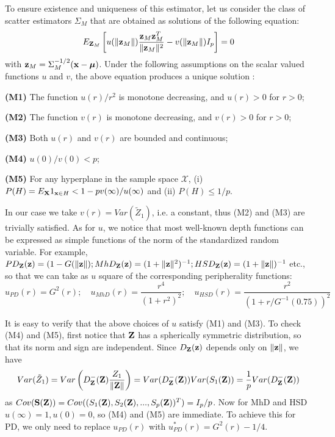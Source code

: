 To ensure existence and uniqueness of this estimator, let us consider the class of scatter estimators $\Sigma_M$ that are obtained as solutions of the following equation:
%
\begin{equation}
E_{{\mathbf{Z}}_M} \left[ u( \| {\bf{z}}_M \| )  \frac{{\bf{z}}_M {\bf{z}}_M^T}{\| {\bf{z}}_M \|^2}  - v( \| {\bf{z}}_M \| ) I_p \right] = 0
\end{equation}
%
with ${\bf{z}}_M = \Sigma_M^{-1/2} ({\bf{x}} - {\boldsymbol{\mu}})$. Under the following assumptions on the scalar valued functions $u$ and $v$, the above equation produces a unique solution \citep{HuberBook81}:
%

\vspace{1em}
\noindent\textbf{(M1)} The function $u(r)/r^2$ is monotone decreasing, and $u(r)>0$ for $r>0$;

\noindent\textbf{(M2)}  The function $v(r)$ is monotone decreasing, and $v(r)>0$ for $r>0$;

\noindent\textbf{(M3)} Both $u(r)$ and $v(r)$ are bounded and continuous;

\noindent\textbf{(M4)} $u(0) / v(0) < p$;

\noindent\textbf{(M5)} For any hyperplane in the sample space $\mathcal X$, (i) $P(H) = E_{\mathbf{X}} 1_{{\bf{x}} \in H} < 1 - p v(\infty) / u(\infty)$ and (ii) $P(H) \leq 1/p$.
%

\vspace{1em}
\noindent In our case we take $v(r) = Var(\tilde Z_1)$, i.e. a constant, thus (M2) and (M3) are trivially satisfied. As for $u$, we notice that most well-known depth functions can be expressed as simple functions of the norm of the standardized random variable. For example, $PD_{\mathbf{Z}} ({\bf{z}}) = (1 - G(\| {\bf{z}} \|); MhD_{\mathbf{Z}} ({\bf{z}}) = (1+\| {\bf{z}} \|^2)^{-1}; HSD_{\mathbf{Z}} ({\bf{z}}) = (1+\| {\bf{z}} \|)^{-1}$ etc., so that we can take as $u$ square of the corresponding peripherality functions:
$$
u_{PD} (r) = G^2 (r); \quad u_{MhD}(r)  = \frac{r^4}{(1 + r^2)^2}; \quad u_{HSD}(r)  = \frac{r^2}{(1 + r/G^{-1}(0.75))^2}
$$
%

It is easy to verify that the above choices of $u$ satisfy (M1) and (M3). To check (M4) and (M5), first notice that ${\mathbf{Z}}$ has a spherically symmetric distribution, so that its norm and sign are independent. Since $D_{\mathbf{Z}}({\bf{z}})$ depends only on $\| {\bf{z}} \|$, we have
%
$$
Var (\tilde Z_1) = Var \left( D^-_{\mathbf{Z}} ({\mathbf{Z}}) \frac{Z_1}{ \|{\mathbf{Z}} \|} \right) = Var (D^-_{\mathbf{Z}} ({\mathbf{Z}})) Var (S_1 ({\mathbf{Z}})) = \frac{1}{p} Var (D^-_{\mathbf{Z}} ({\mathbf{Z}}))
$$
%
as $Cov({\mathbf{S}}({\mathbf{Z}})) = Cov((S_1({\mathbf{Z}}), S_2({\mathbf{Z}}), ..., S_p({\mathbf{Z}}))^T) = I_p/p$. Now for MhD and HSD $u(\infty)=1, u(0)=0$, so (M4) and (M5) are immediate. To achieve this for PD, we only need to replace $u_{PD}(r)$ with $u_{PD}^*(r) = G^2(r) - 1/4$.

